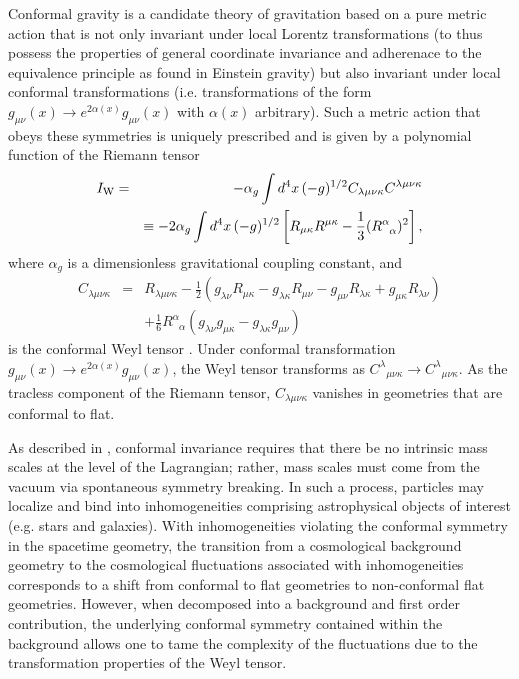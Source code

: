 Conformal gravity is a candidate theory of gravitation based on a pure metric action that is not only invariant under local Lorentz transformations (to thus possess the properties of general coordinate invariance and adherenace to the equivalence principle as found in Einstein gravity) but also invariant under local conformal transformations (i.e. transformations of the form $g_{\mu\nu}(x) \to e^{2\alpha(x)}g_{\mu\nu}(x)$ with $\alpha(x)$ arbitrary). Such a metric action that obeys these symmetries is uniquely prescribed and is given by a polynomial function of the Riemann tensor \cite{mannheim_2006}
%
\begin{eqnarray}
I_{\rm W}&=&-\alpha_g\int d^4x\, (-g)^{1/2}C_{\lambda\mu\nu\kappa}
C^{\lambda\mu\nu\kappa}
\nonumber\\
&&\equiv -2\alpha_g\int d^4x\, (-g)^{1/2}\left[R_{\mu\kappa}R^{\mu\kappa}-\frac{1}{3} (R^{\alpha}_{\phantom{\alpha}\alpha})^2\right],
\label{AP1}
\end{eqnarray}
% 
where $\alpha_g$ is a dimensionless  gravitational coupling constant, and
%
\begin{eqnarray}
C_{\lambda\mu\nu\kappa}&=& R_{\lambda\mu\nu\kappa}
-\frac{1}{2}\left(g_{\lambda\nu}R_{\mu\kappa}-
g_{\lambda\kappa}R_{\mu\nu}-
g_{\mu\nu}R_{\lambda\kappa}+
g_{\mu\kappa}R_{\lambda\nu}\right)
\nonumber\\
&&+\frac{1}{6}R^{\alpha}_{\phantom{\alpha}\alpha}\left(
g_{\lambda\nu}g_{\mu\kappa}-
g_{\lambda\kappa}g_{\mu\nu}\right)
\label{AP2}
\end{eqnarray}
% 
is the conformal Weyl tensor \cite{bach_1921}. Under conformal transformation $g_{\mu\nu}(x) \to e^{2\alpha(x)}g_{\mu\nu}(x)$, the Weyl tensor transforms as $C^\lambda{}_{\mu\nu\kappa} \to C^\lambda{}_{\mu\nu\kappa}$. As the tracless component of the Riemann tensor, $C_{\lambda\mu\nu\kappa}$ vanishes in geometries that are conformal to flat. 

As described in \cite{mannheim_2012}, conformal invariance requires that there be no intrinsic mass scales at the level of the Lagrangian; rather, mass scales must come from the vacuum via spontaneous symmetry breaking. In such a process, particles may localize and bind into inhomogeneities comprising astrophysical objects of interest (e.g. stars and galaxies). With inhomogeneities violating the conformal symmetry in the spacetime geometry, the transition from a cosmological background geometry to the cosmological fluctuations associated with inhomogeneities corresponds to a shift from conformal to flat geometries to non-conformal flat geometries. However, when decomposed into a background and first order contribution, the underlying conformal symmetry contained within the background allows one to tame the complexity of the fluctuations due to the transformation properties of the Weyl tensor.

